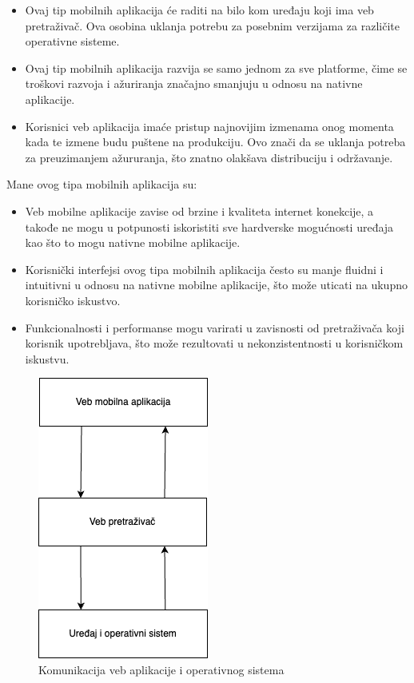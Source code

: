 \documentclass[12pt,oneside]{memoir}
\begin{document}
\begin{itemize}
    \item Ovaj tip mobilnih aplikacija će raditi na bilo kom uređaju koji ima veb pretraživač. Ova osobina uklanja potrebu za posebnim verzijama za različite operativne sisteme.
    \item Ovaj tip mobilnih aplikacija razvija se samo jednom za sve platforme, čime se troškovi razvoja i ažuriranja značajno smanjuju u odnosu na nativne aplikacije.
    \item Korisnici veb aplikacija imaće pristup najnovijim izmenama onog momenta kada te izmene budu puštene na produkciju. Ovo znači da se uklanja potreba za preuzimanjem ažururanja, što znatno olakšava distribuciju i održavanje.
\end{itemize}
Mane ovog tipa mobilnih aplikacija su:
\begin{itemize}
    \item Veb mobilne aplikacije zavise od brzine i kvaliteta internet konekcije, a takođe ne mogu u potpunosti iskoristiti sve hardverske mogućnosti uređaja kao što to mogu nativne mobilne aplikacije.
    \item Korisnički interfejsi ovog tipa mobilnih aplikacija često su manje fluidni i intuitivni u odnosu na nativne mobilne aplikacije, što može uticati na ukupno korisničko iskustvo.
    \item Funkcionalnosti i performanse mogu varirati u zavisnosti od pretraživača koji korisnik upotrebljava, što može rezultovati u nekonzistentnosti u korisničkom iskustvu.
\end{itemize}

\begin{figure}[h]
    \centering
    \includegraphics[scale=0.5]{docs/images/chapterTwo/vebMobilnaAplikacija.png}
    \caption{Komunikacija veb aplikacije i operativnog sistema}
    \label{fig:vebMobilnaAplikacija}
\end{figure}
\end{document}
